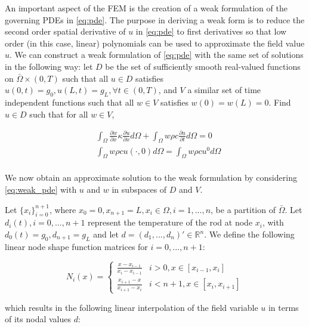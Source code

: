 \documentclass{article}
\newcommand*{\R}{\mathbb{R}}
\begin{document}
An important aspect of the FEM is the creation of a weak formulation of the
governing PDEs in \cref{eq:pde}. The purpose in deriving a weak form is to
reduce the second order spatial derivative of $u$ in \cref{eq:pde} to first
derivatives so that low order (in this case, linear) polynomials can be used to
approximate the field value $u$. We can construct a weak formulation of \cref{eq:pde} with the same set of
solutions in the following way: let $D$ be the set of sufficiently smooth 
real-valued functions on $\bar{\Omega} \times (0, T)$ such that all 
$u \in D$ satisfies $u(0, t) = g_0, u(L, t) = g_L, \forall t \in (0, T)$, 
and $V$ a similar set of time
independent functions such that all $w \in V$ satisfies $w(0) = w(L) = 0$. 
Find $u \in D$ such that for all $w \in V$,

\begin{equation}\label{eq:weak_pde}
    \begin{aligned}
        &\int_{\Omega} \frac{\partial w}{\partial x} \kappa \frac{\partial
        u}{\partial x} d \Omega + 
        \int_{\Omega} w \rho c \frac{\partial u}{\partial t} d \Omega = 0 \\
        &\int_{\Omega} w \rho c u(\cdot, 0) d \Omega =
        \int_{\Omega} w \rho c u^0 d \Omega \\
    \end{aligned}
\end{equation}

We now obtain an approximate solution to the weak formulation by considering
\cref{eq:weak_pde} with $u$ and $w$ in subspaces of $D$ and $V$.

Let $\{x_i\}_{i = 0}^{n +
1}$, where $x_0 = 0, x_{n+1} = L, x_i \in \Omega, i = 1,...,n$, be a partition of
$\bar\Omega$. Let $d_i(t), i = 0,...,n+1$ represent the
temperature of the rod at node $x_i$, with $d_0(t) = g_0, d_{n+1} = g_L$ and let $d = (d_1, ..., d_n)' \in
\R^n$. We define the following linear node shape function matrices for $i =
0,...,n+1$:

\begin{equation}
    N_i(x) = \begin{cases}
        \frac{x - x_{i - 1}}{x_i - x_{i - 1}} & i > 0, x \in [x_{i-1}, x_i] \\
        \frac{x_{i+1} - x}{x_{i+1} - x_{i}} & i < n+1, x \in [x_{i}, x_{i+1}] 
    \end{cases} 
\end{equation}

which results in the following linear interpolation of the field variable $u$ in
terms of its nodal values $d$:
\end{document}
